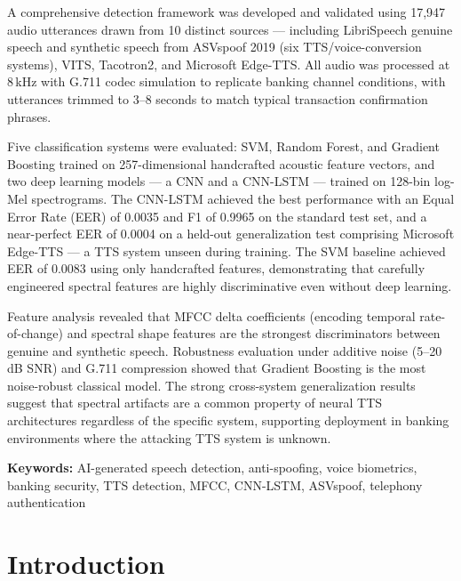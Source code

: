 \documentclass[12pt, a4paper, oneside]{report}
\begin{document}
A comprehensive detection framework was developed and validated using 17,947 audio utterances drawn from 10 distinct sources --- including LibriSpeech genuine speech and synthetic speech from ASVspoof 2019 (six TTS/voice-conversion systems), VITS, Tacotron2, and Microsoft Edge-TTS. All audio was processed at 8\,kHz with G.711 codec simulation to replicate banking channel conditions, with utterances trimmed to 3--8 seconds to match typical transaction confirmation phrases.

Five classification systems were evaluated: SVM, Random Forest, and Gradient Boosting trained on 257-dimensional handcrafted acoustic feature vectors, and two deep learning models --- a CNN and a CNN-LSTM --- trained on 128-bin log-Mel spectrograms. The CNN-LSTM achieved the best performance with an Equal Error Rate (EER) of 0.0035 and F1 of 0.9965 on the standard test set, and a near-perfect EER of 0.0004 on a held-out generalization test comprising Microsoft Edge-TTS --- a TTS system unseen during training. The SVM baseline achieved EER of 0.0083 using only handcrafted features, demonstrating that carefully engineered spectral features are highly discriminative even without deep learning.

Feature analysis revealed that MFCC delta coefficients (encoding temporal rate-of-change) and spectral shape features are the strongest discriminators between genuine and synthetic speech. Robustness evaluation under additive noise (5--20\,dB SNR) and G.711 compression showed that Gradient Boosting is the most noise-robust classical model. The strong cross-system generalization results suggest that spectral artifacts are a common property of neural TTS architectures regardless of the specific system, supporting deployment in banking environments where the attacking TTS system is unknown.

\bigskip
\noindent\textbf{Keywords:} AI-generated speech detection, anti-spoofing, voice biometrics, banking security, TTS detection, MFCC, CNN-LSTM, ASVspoof, telephony authentication

\tableofcontents
\listoffigures
\listoftables
\newpage

\chapter{Introduction}
\end{document}
